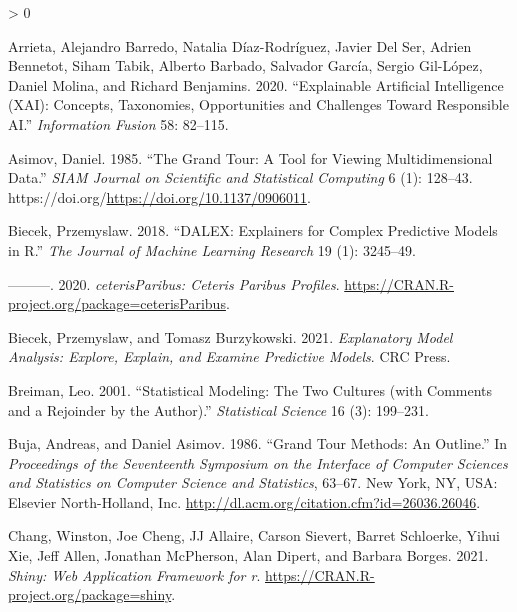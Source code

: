 \documentclass[
]{article}
\newlength{\cslhangindent}
\newenvironment{CSLReferences}[2] %
 {%
  \setlength{\parindent}{0pt}
  \ifodd #1 \everypar{\setlength{\hangindent}{\cslhangindent}}\ignorespaces\fi
  \ifnum #2 > 0
  \setlength{\parskip}{#2\baselineskip}
  \fi
 }%
 {}
\begin{document}
\hypertarget{refs}{}
\begin{CSLReferences}{1}{0}
\leavevmode\hypertarget{ref-arrieta_explainable_2020}{}%
Arrieta, Alejandro Barredo, Natalia Díaz-Rodríguez, Javier Del Ser, Adrien Bennetot, Siham Tabik, Alberto Barbado, Salvador García, Sergio Gil-López, Daniel Molina, and Richard Benjamins. 2020. {``Explainable {Artificial} {Intelligence} ({XAI}): {Concepts}, Taxonomies, Opportunities and Challenges Toward Responsible {AI}.''} \emph{Information Fusion} 58: 82--115.

\leavevmode\hypertarget{ref-asimov_grand_1985}{}%
Asimov, Daniel. 1985. {``The {Grand} {Tour}: A {Tool} for {Viewing} {Multidimensional} {Data}.''} \emph{SIAM Journal on Scientific and Statistical Computing} 6 (1): 128--43. https://doi.org/\url{https://doi.org/10.1137/0906011}.

\leavevmode\hypertarget{ref-biecek_dalex_2018}{}%
Biecek, Przemyslaw. 2018. {``{DALEX}: Explainers for Complex Predictive Models in {R}.''} \emph{The Journal of Machine Learning Research} 19 (1): 3245--49.

\leavevmode\hypertarget{ref-biecek_ceterisparibus_2020}{}%
---------. 2020. \emph{{ceterisParibus}: {Ceteris} {Paribus} {Profiles}}. \url{https://CRAN.R-project.org/package=ceterisParibus}.

\leavevmode\hypertarget{ref-biecek_explanatory_2021}{}%
Biecek, Przemyslaw, and Tomasz Burzykowski. 2021. \emph{Explanatory {Model} {Analysis}: {Explore}, {Explain}, and {Examine} {Predictive} {Models}}. CRC Press.

\leavevmode\hypertarget{ref-breiman_statistical_2001}{}%
Breiman, Leo. 2001. {``Statistical Modeling: {The} Two Cultures (with Comments and a Rejoinder by the Author).''} \emph{Statistical Science} 16 (3): 199--231.

\leavevmode\hypertarget{ref-buja_grand_1986}{}%
Buja, Andreas, and Daniel Asimov. 1986. {``Grand {Tour} {Methods}: {An} {Outline}.''} In \emph{Proceedings of the {Seventeenth} {Symposium} on the {Interface} of {Computer} {Sciences} and {Statistics} on {Computer} {Science} and {Statistics}}, 63--67. New York, NY, USA: Elsevier North-Holland, Inc. \url{http://dl.acm.org/citation.cfm?id=26036.26046}.

\leavevmode\hypertarget{ref-chang_shiny_2021}{}%
Chang, Winston, Joe Cheng, JJ Allaire, Carson Sievert, Barret Schloerke, Yihui Xie, Jeff Allen, Jonathan McPherson, Alan Dipert, and Barbara Borges. 2021. \emph{Shiny: Web Application Framework for r}. \url{https://CRAN.R-project.org/package=shiny}.


\end{CSLReferences}
\end{document}
